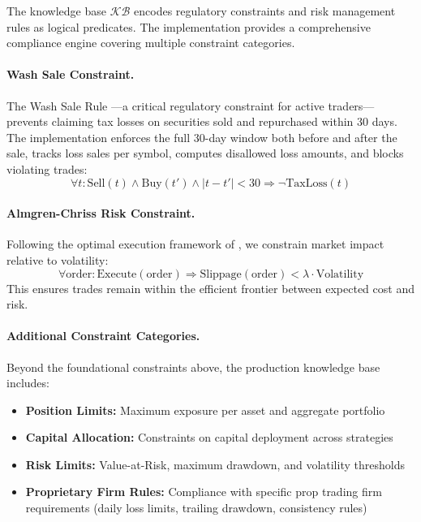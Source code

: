 \documentclass[12pt, a4paper]{article}
\begin{document}
The knowledge base $\mathcal{KB}$ encodes regulatory constraints and risk management rules as logical predicates. The implementation provides a comprehensive compliance engine covering multiple constraint categories.

\paragraph{Wash Sale Constraint.}
The Wash Sale Rule \citep{irs2024wash}---a critical regulatory constraint for active traders---prevents claiming tax losses on securities sold and repurchased within 30 days. The implementation enforces the full 30-day window both before and after the sale, tracks loss sales per symbol, computes disallowed loss amounts, and blocks violating trades:
\begin{equation}
	\forall t: \text{Sell}(t) \land \text{Buy}(t') \land |t-t'| < 30 \Rightarrow \neg \text{TaxLoss}(t)
	\label{eq:wash_sale}
\end{equation}

\paragraph{Almgren-Chriss Risk Constraint.}
Following the optimal execution framework of \citet{almgren2001optimal}, we constrain market impact relative to volatility:
\begin{equation}
	\forall \text{order}: \text{Execute}(\text{order}) \Rightarrow \text{Slippage}(\text{order}) < \lambda \cdot \text{Volatility}
	\label{eq:almgren_chriss_constraint}
\end{equation}
This ensures trades remain within the efficient frontier between expected cost and risk.

\paragraph{Additional Constraint Categories.}
Beyond the foundational constraints above, the production knowledge base includes:

\begin{itemize}
	\item \textbf{Position Limits:} Maximum exposure per asset and aggregate portfolio
	\item \textbf{Capital Allocation:} Constraints on capital deployment across strategies
	\item \textbf{Risk Limits:} Value-at-Risk, maximum drawdown, and volatility thresholds
	\item \textbf{Proprietary Firm Rules:} Compliance with specific prop trading firm requirements (daily loss limits, trailing drawdown, consistency rules)
\end{itemize}
\end{document}

